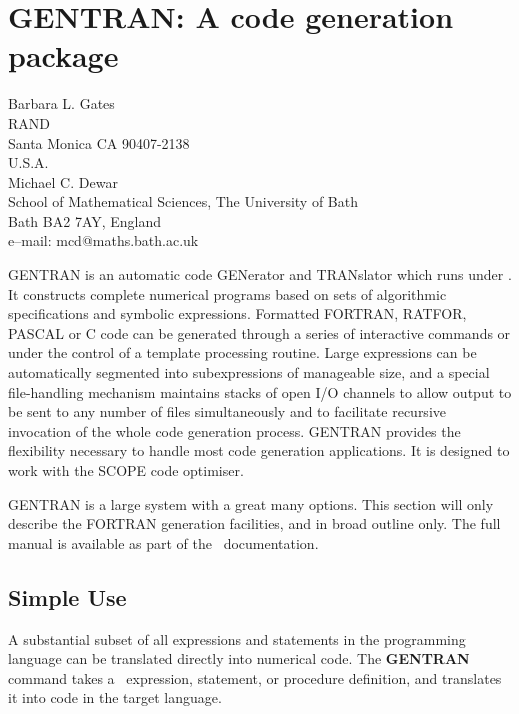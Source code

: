 \chapter{GENTRAN: A code generation package}
\label{GENTRAN}

{\footnotesize
\begin{center}
Barbara L. Gates \\
RAND \\
Santa Monica CA 90407-2138 \\
U.S.A. \\[0.1in]
Michael C. Dewar \\
School of Mathematical Sciences, The University of Bath \\
Bath BA2 7AY, England \\[0.05in]
e--mail: mcd@maths.bath.ac.uk
\end{center}
}


GENTRAN is an automatic code GENerator and TRANslator which runs under
\REDUCE.  It constructs complete numerical programs based on sets of
algorithmic specifications and symbolic expressions.  Formatted
FORTRAN, RATFOR, PASCAL or C code can be generated through a series of
interactive commands or under the control of a template processing
routine.  Large expressions can be automatically segmented into
subexpressions of manageable size, and a special file-handling
mechanism maintains stacks of open I/O channels to allow output to be
sent to any number of files simultaneously and to facilitate recursive
invocation of the whole code generation process.  GENTRAN provides the
flexibility necessary to handle most code generation applications.  It
is designed to work with the SCOPE code optimiser.

GENTRAN is a large system with a great many options.  This section
will only describe the FORTRAN generation facilities, and in broad
outline only.  The full manual is available as part of the \REDUCE\
documentation.

\section{Simple Use}

A substantial subset of all expressions and statements in the \REDUCE{}
programming language can be translated directly into numerical code.
The {\bf GENTRAN} command takes a \REDUCE\ expression, statement, or
procedure definition, and translates it into code in the target
language.


